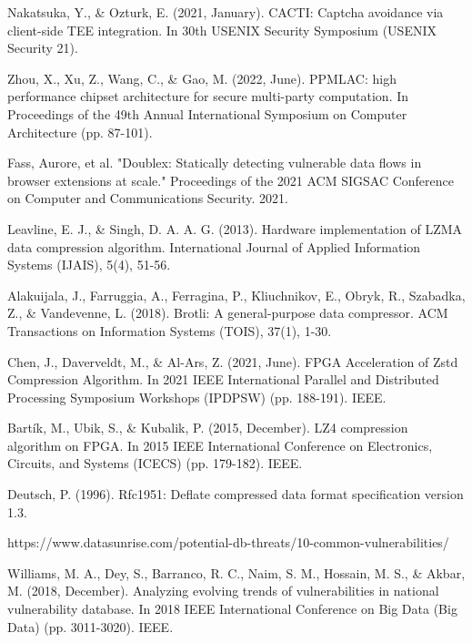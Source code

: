 \documentclass[runningheads,10pt]{llncs}
\begin{document}
	\begin{thebibliography}{8}
		Nakatsuka, Y., \& Ozturk, E. (2021, January). CACTI: Captcha avoidance via client-side TEE integration. In 30th USENIX Security Symposium (USENIX Security 21).



		Zhou, X., Xu, Z., Wang, C., \& Gao, M. (2022, June). PPMLAC: high performance chipset architecture for secure multi-party computation. In Proceedings of the 49th Annual International Symposium on Computer Architecture (pp. 87-101).

		Fass, Aurore, et al. "Doublex: Statically detecting vulnerable data flows in browser extensions at scale." Proceedings of the 2021 ACM SIGSAC Conference on Computer and Communications Security. 2021.

		Leavline, E. J., \& Singh, D. A. A. G. (2013). Hardware implementation of LZMA data compression algorithm. International Journal of Applied Information Systems (IJAIS), 5(4), 51-56.

		Alakuijala, J., Farruggia, A., Ferragina, P., Kliuchnikov, E., Obryk, R., Szabadka, Z., \& Vandevenne, L. (2018). Brotli: A general-purpose data compressor. ACM Transactions on Information Systems (TOIS), 37(1), 1-30.

		Chen, J., Daverveldt, M., \& Al-Ars, Z. (2021, June). FPGA Acceleration of Zstd Compression Algorithm. In 2021 IEEE International Parallel and Distributed Processing Symposium Workshops (IPDPSW) (pp. 188-191). IEEE.

		Bartík, M., Ubik, S., \& Kubalik, P. (2015, December). LZ4 compression algorithm on FPGA. In 2015 IEEE International Conference on Electronics, Circuits, and Systems (ICECS) (pp. 179-182). IEEE.

		Deutsch, P. (1996). Rfc1951: Deflate compressed data format specification version 1.3.

		https://www.datasunrise.com/potential-db-threats/10-common-vulnerabilities/

		Williams, M. A., Dey, S., Barranco, R. C., Naim, S. M., Hossain, M. S., \& Akbar, M. (2018, December). Analyzing evolving trends of vulnerabilities in national vulnerability database. In 2018 IEEE International Conference on Big Data (Big Data) (pp. 3011-3020). IEEE.

	\end{thebibliography}
\end{document}
